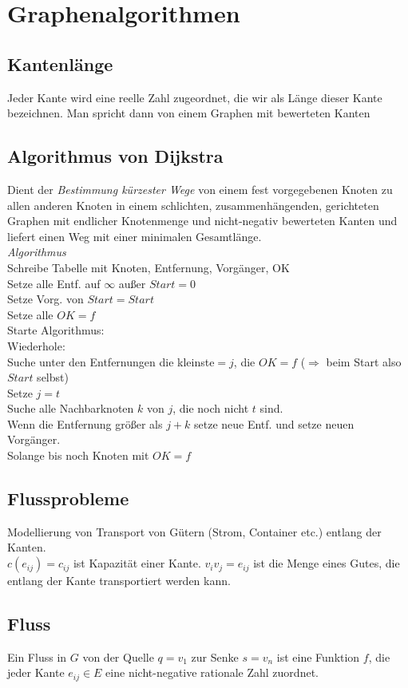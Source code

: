 \section{Graphenalgorithmen}
\subsection*{Kantenlänge}
Jeder Kante wird eine reelle Zahl zugeordnet, die wir als Länge dieser Kante bezeichnen.
Man spricht dann von einem Graphen mit bewerteten Kanten
\subsection*{Algorithmus von Dijkstra}
Dient der \emph{Bestimmung kürzester Wege} von einem fest vorgegebenen Knoten zu allen anderen Knoten
in einem schlichten, zusammenhängenden, gerichteten Graphen mit endlicher Knotenmenge und nicht-negativ bewerteten Kanten
und liefert einen Weg mit einer minimalen Gesamtlänge.\\
\emph{Algorithmus}\\
Schreibe Tabelle mit Knoten, Entfernung, Vorgänger, OK\\
Setze alle Entf. auf $\infty$ außer $Start=0$\\
Setze Vorg. von $Start=Start$\\
Setze alle $OK=f$\\
Starte Algorithmus:\\
Wiederhole:\\
	Suche unter den Entfernungen die kleinste$=j$, die $OK=f$ ($\Rightarrow$ beim Start also $Start$ selbst)\\
		Setze $j=t$\\
		Suche alle Nachbarknoten $k$ von $j$, die noch nicht $t$ sind.\\
		Wenn die Entfernung größer als $j+k$ setze neue Entf. und setze neuen Vorgänger.\\	
Solange bis noch Knoten mit $OK=f$
\subsection*{Flussprobleme}
Modellierung von Transport von Gütern (Strom, Container etc.) entlang der Kanten.\\
$c(e_{ij})=c_{ij}$ ist Kapazität einer Kante. $v_iv_j=e_{ij}$ ist die Menge eines Gutes,
die entlang der Kante transportiert werden kann.
\subsection*{Fluss}
Ein Fluss in $G$ von der Quelle $q=v_1$ zur Senke $s=v_n$ ist eine Funktion $f$, die jeder
Kante $e_{ij}\in E$ eine nicht-negative rationale Zahl zuordnet.
